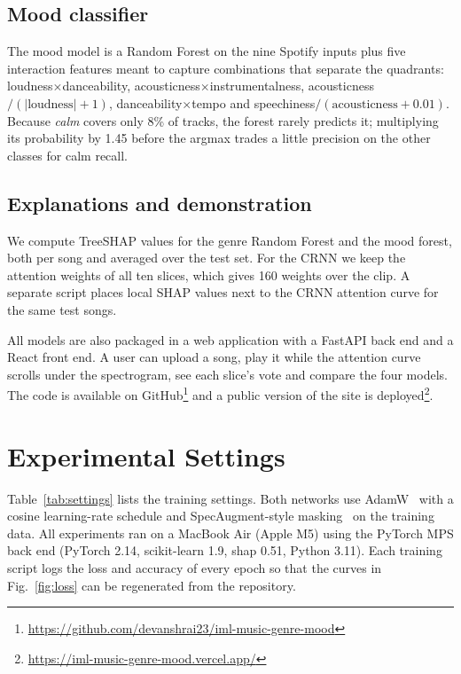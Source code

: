 \documentclass[conference]{IEEEtran}
\begin{document}
\subsection{Mood classifier}
The mood model is a Random Forest on the nine Spotify inputs plus five interaction features meant to capture combinations that separate the quadrants: loudness$\times$danceability, acousticness$\times$instrumentalness, acousticness$/(|\text{loudness}|+1)$, danceability$\times$tempo and speechiness$/(\text{acousticness}+0.01)$. Because \emph{calm} covers only 8\% of tracks, the forest rarely predicts it; multiplying its probability by 1.45 before the argmax trades a little precision on the other classes for calm recall.

\subsection{Explanations and demonstration}
We compute TreeSHAP values for the genre Random Forest and the mood forest, both per song and averaged over the test set. For the CRNN we keep the attention weights of all ten slices, which gives 160 weights over the clip. A separate script places local SHAP values next to the CRNN attention curve for the same test songs.

All models are also packaged in a web application with a FastAPI back end and a React front end. A user can upload a song, play it while the attention curve scrolls under the spectrogram, see each slice's vote and compare the four models. The code is available on GitHub\footnote{\url{https://github.com/devanshrai23/iml-music-genre-mood}} and a public version of the site is deployed\footnote{\url{https://iml-music-genre-mood.vercel.app/}}.

\section{Experimental Settings}
Table~\ref{tab:settings} lists the training settings. Both networks use AdamW~\cite{loshchilov2019} with a cosine learning-rate schedule and SpecAugment-style masking~\cite{park2019} on the training data. All experiments ran on a MacBook Air (Apple M5) using the PyTorch MPS back end (PyTorch 2.14, scikit-learn 1.9, shap 0.51, Python 3.11). Each training script logs the loss and accuracy of every epoch so that the curves in Fig.~\ref{fig:loss} can be regenerated from the repository.
\end{document}
